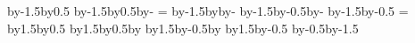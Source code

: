 {{    \pgf@anchor@pcbtact@pinc\pgfpathcircle{\pgfpoint{\pgf@x}{\pgf@y}}{\pgfutil@tempdima}
    \pgf@anchor@pcbtact@pinc\pgfpathcircle{\pgfpoint{\pgf@x}{\pgf@y}}{\pgfutil@tempdimb}
    \pgf@anchor@pcbtact@pind\pgfpathcircle{\pgfpoint{\pgf@x}{\pgf@y}}{\pgfutil@tempdima}
    \pgf@anchor@pcbtact@pind\pgfpathcircle{\pgfpoint{\pgf@x}{\pgf@y}}{\pgfutil@tempdimb}
    \pgf@anchor@pcbtact@pine\pgfpathcircle{\pgfpoint{\pgf@x}{\pgf@y}}{\pgfutil@tempdima}
    \pgf@anchor@pcbtact@pine\pgfpathcircle{\pgfpoint{\pgf@x}{\pgf@y}}{\pgfutil@tempdimb}
    \pgf@anchor@pcbtact@pinf\pgfpathcircle{\pgfpoint{\pgf@x}{\pgf@y}}{\pgfutil@tempdima}
    \pgf@anchor@pcbtact@pinf\pgfpathcircle{\pgfpoint{\pgf@x}{\pgf@y}}{\pgfutil@tempdimb}
    \color{gray}
    \pgfsetlinewidth{2\pgflinewidth}
    \centerpoint\advance\pgf@x by-1.5\pgfutil@tempdimc\advance\pgf@y by0.5\pgfutil@tempdimd\pgfpathmoveto{\pgfpoint{\pgf@x}{\pgf@y}}
    \centerpoint\advance\pgf@x by-1.5\pgfutil@tempdimc\advance\pgf@y by0.5\pgfutil@tempdimd\advance\pgf@x by-\pgfutil@tempdime\pgfpathlineto{\pgfpoint{\pgf@x}{\pgf@y}}
    \pgfutil@tempdimf=\dipnudge
    \centerpoint\advance\pgf@x by-1.5\pgfutil@tempdimc\advance\pgf@y by\pgfutil@tempdimf\advance\pgf@x by-\pgfutil@tempdime\pgfpathlineto{\pgfpoint{\pgf@x}{\pgf@y}}
    \centerpoint\advance\pgf@x by-1.5\pgfutil@tempdimc\advance\pgf@y by-0.5\pgfutil@tempdimd\advance\pgf@x by-\pgfutil@tempdime\pgfpathlineto{\pgfpoint{\pgf@x}{\pgf@y}}
    \centerpoint\advance\pgf@x by-1.5\pgfutil@tempdimc\advance\pgf@y by-0.5\pgfutil@tempdimd\pgfpathlineto{\pgfpoint{\pgf@x}{\pgf@y}}
    \pgfutil@tempdime=\tactright
    \centerpoint\advance\pgf@x by1.5\pgfutil@tempdimc\advance\pgf@y by0.5\pgfutil@tempdimd\pgfpathmoveto{\pgfpoint{\pgf@x}{\pgf@y}}
    \centerpoint\advance\pgf@x by1.5\pgfutil@tempdimc\advance\pgf@y by0.5\pgfutil@tempdimd\advance\pgf@x by\pgfutil@tempdime\pgfpathlineto{\pgfpoint{\pgf@x}{\pgf@y}}
    \centerpoint\advance\pgf@x by1.5\pgfutil@tempdimc\advance\pgf@y by-0.5\pgfutil@tempdimd\advance\pgf@x by\pgfutil@tempdime\pgfpathlineto{\pgfpoint{\pgf@x}{\pgf@y}}
    \centerpoint\advance\pgf@x by1.5\pgfutil@tempdimc\advance\pgf@y by-0.5\pgfutil@tempdimd\pgfpathlineto{\pgfpoint{\pgf@x}{\pgf@y}}
    \color{black}
    \begingroup
    \tikzset{pcb/part labels} %
    \tikz@textfont
    \centerpoint\advance\pgf@y by-0.5\pgfutil@tempdimd\advance\pgf@y by-1.5\pgfutil@tempdimb
    \endgroup
  }
}
